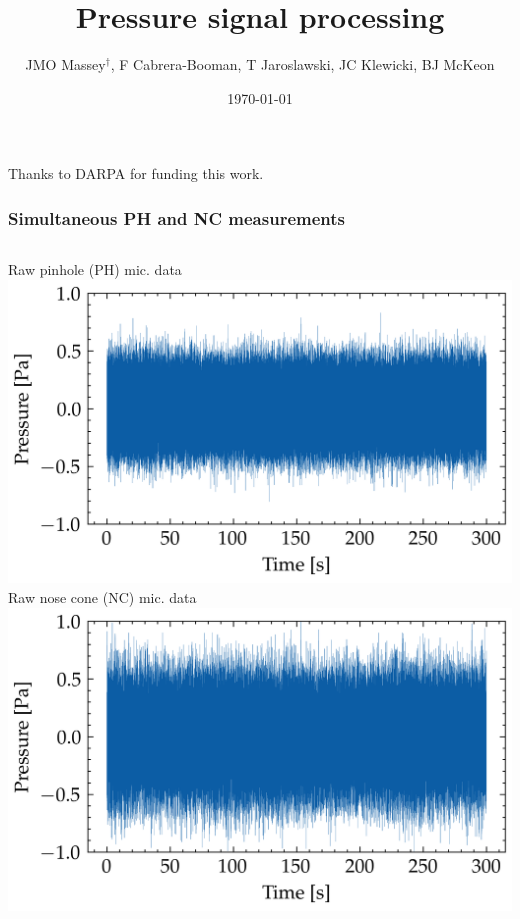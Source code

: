 \documentclass[aspectratio=169,10pt]{beamer}
\title{Pressure signal processing}
\author{JMO Massey$^{\dag}$, F Cabrera-Booman, T Jaroslawski, JC Klewicki, BJ McKeon}
\institute{Center for Turbulence Research \\ Stanford University}
\date{\today}
\begin{document}
\begin{frame}
    \setcounter{framenumber}{0}
    \titlepage
    \vfill
    {\scriptsize \centering Thanks to DARPA for funding this work.\par}
\end{frame}

\begin{frame}
    \frametitle{Simultaneous PH and NC measurements}
    \begin{columns}[c]
            \centering
            Raw pinhole (PH) mic. data\\
            \includegraphics[width=0.95\linewidth]{../figures/cali_09/flow/raw/ph_atm.png}
            \centering
            Raw nose cone (NC) mic. data\\
            \includegraphics[width=0.95\linewidth]{../figures/cali_09/flow/raw/nc_atm.png}
    \end{columns}
\end{frame}
\end{document}
